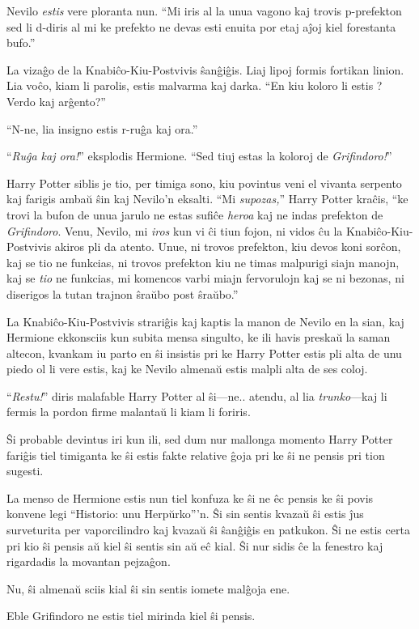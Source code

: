 Nevilo \emph{estis} vere ploranta nun. ``Mi iris al la unua vagono kaj
trovis p-prefekton sed li d-diris al mi ke prefekto ne devas esti
enuita por etaj aĵoj kiel forestanta bufo.''

La vizaĝo de la Knabiĉo-Kiu-Postvivis ŝanĝiĝis. Liaj lipoj formis
fortikan linion. Lia voĉo, kiam li parolis, estis malvarma kaj
darka. ``En kiu koloro li estis ? Verdo kaj arĝento?''

``N-ne, lia insigno estis r-ruĝa kaj ora.''

``\emph{Ruĝa kaj ora!}'' eksplodis Hermione. ``Sed tiuj estas la
koloroj de \emph{Grifindoro!}''

Harry Potter siblis je tio, per timiga sono, kiu povintus veni el
vivanta serpento kaj farigis ambaŭ ŝin kaj Nevilo'n eksalti. ``Mi
\emph{supozas,}'' Harry Potter kraĉis, ``ke trovi la bufon de unua
jarulo ne estas sufiĉe \emph{heroa} kaj ne indas prefekton de
\emph{Grifindoro}. Venu, Nevilo, mi \emph{iros} kun vi ĉi tiun fojon,
ni vidos ĉu la Knabiĉo-Kiu-Postvivis akiros pli da atento. Unue, ni
trovos prefekton, kiu devos koni sorĉon, kaj se tio ne funkcias, ni
trovos prefekton kiu ne timas malpurigi siajn manojn, kaj se
\emph{tio} ne funkcias, mi komencos varbi miajn fervorulojn kaj se ni
bezonas, ni diserigos la tutan trajnon ŝraŭbo post ŝraŭbo.''

La Knabiĉo-Kiu-Postvivis strariĝis kaj kaptis la manon de Nevilo en la
sian, kaj Hermione ekkonsciis kun subita mensa singulto, ke ili havis
preskaŭ la saman altecon, kvankam iu parto en ŝi insistis pri ke
Harry Potter estis pli alta de unu piedo ol li vere estis, kaj ke
Nevilo almenaŭ estis malpli alta de ses coloj.

``\emph{Restu!}'' diris malafable Harry Potter al ŝi—ne.. atendu, al lia
\emph{trunko}—kaj li fermis la pordon firme malantaŭ li kiam li
foriris.

Ŝi probable devintus iri kun ili, sed dum nur mallonga momento Harry
Potter fariĝis tiel timiganta ke ŝi estis fakte relative ĝoja pri ke
ŝi ne pensis pri tion sugesti.

La menso de Hermione estis nun tiel konfuza ke ŝi ne êc pensis ke ŝi
povis konvene legi ``Historio: unu Herpŭrko'''n. Ŝi sin sentis kvazaŭ
ŝi estis ĵus surveturita per vaporcilindro kaj kvazaŭ ŝi ŝanĝiĝis en
patkukon. Ŝi ne estis certa pri kio ŝi pensis aŭ kiel ŝi sentis sin aŭ
eĉ kial. Ŝi nur sidis ĉe la fenestro kaj rigardadis la movantan
pejzaĝon.

Nu, ŝi almenaŭ sciis kial ŝi sin sentis iomete malĝoja ene.

Eble Grifindoro ne estis tiel mirinda kiel ŝi pensis.
